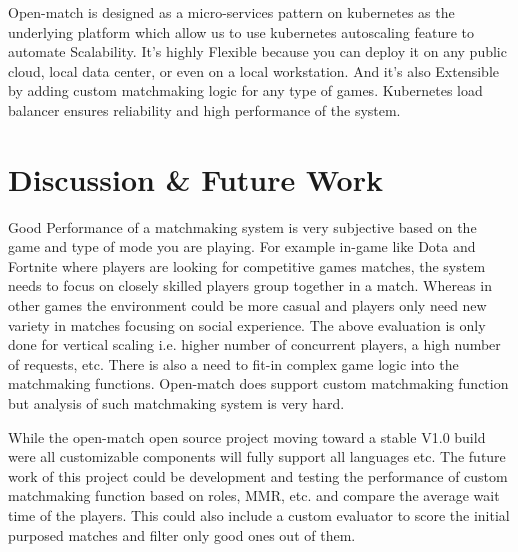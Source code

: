 \documentclass[12pt, letter]{article}
\begin{document}
Open-match is designed as a micro-services pattern on kubernetes as the underlying platform which allow us to use kubernetes autoscaling feature to automate Scalability. It's highly Flexible because you can deploy it on any public cloud, local data center, or even on a local workstation. And it's also Extensible by adding custom matchmaking logic for any type of games. Kubernetes load balancer ensures reliability and high performance of the system.

\section{Discussion \& Future Work}

Good Performance of a matchmaking system is very subjective based on the game and type of mode you are playing. For example in-game like Dota and Fortnite where players are looking for competitive games matches, the system needs to focus on closely skilled players group together in a match. Whereas in other games the environment could be more casual and players only need new variety in matches focusing on social experience. The above evaluation is only done for vertical scaling i.e. higher number of concurrent players, a high number of requests, etc. There is also a need to fit-in complex game logic into the matchmaking functions. Open-match does support custom matchmaking function but analysis of such matchmaking system is very hard.

    While the open-match open source project moving toward a stable V1.0 build were all customizable components will fully support all languages etc. The future work of this project could be development and testing the performance of custom matchmaking function based on roles, MMR, etc. and compare the average wait time of the players. This could also include a custom evaluator to score the initial purposed matches and filter only good ones out of them.
\end{document}

